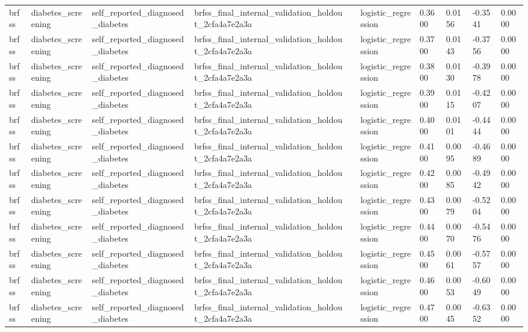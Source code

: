\begin{tabular}{llllllllll}
brfss & diabetes\_screening & self\_reported\_diagnosed\_diabetes & brfss\_final\_internal\_validation\_holdout\_2cfa4a7e2a3a &  & logistic\_regression & 0.3600 & 0.0156 & -0.3541 & 0.0000 \\
brfss & diabetes\_screening & self\_reported\_diagnosed\_diabetes & brfss\_final\_internal\_validation\_holdout\_2cfa4a7e2a3a &  & logistic\_regression & 0.3700 & 0.0143 & -0.3756 & 0.0000 \\
brfss & diabetes\_screening & self\_reported\_diagnosed\_diabetes & brfss\_final\_internal\_validation\_holdout\_2cfa4a7e2a3a &  & logistic\_regression & 0.3800 & 0.0130 & -0.3978 & 0.0000 \\
brfss & diabetes\_screening & self\_reported\_diagnosed\_diabetes & brfss\_final\_internal\_validation\_holdout\_2cfa4a7e2a3a &  & logistic\_regression & 0.3900 & 0.0115 & -0.4207 & 0.0000 \\
brfss & diabetes\_screening & self\_reported\_diagnosed\_diabetes & brfss\_final\_internal\_validation\_holdout\_2cfa4a7e2a3a &  & logistic\_regression & 0.4000 & 0.0101 & -0.4444 & 0.0000 \\
brfss & diabetes\_screening & self\_reported\_diagnosed\_diabetes & brfss\_final\_internal\_validation\_holdout\_2cfa4a7e2a3a &  & logistic\_regression & 0.4100 & 0.0095 & -0.4689 & 0.0000 \\
brfss & diabetes\_screening & self\_reported\_diagnosed\_diabetes & brfss\_final\_internal\_validation\_holdout\_2cfa4a7e2a3a &  & logistic\_regression & 0.4200 & 0.0085 & -0.4942 & 0.0000 \\
brfss & diabetes\_screening & self\_reported\_diagnosed\_diabetes & brfss\_final\_internal\_validation\_holdout\_2cfa4a7e2a3a &  & logistic\_regression & 0.4300 & 0.0079 & -0.5204 & 0.0000 \\
brfss & diabetes\_screening & self\_reported\_diagnosed\_diabetes & brfss\_final\_internal\_validation\_holdout\_2cfa4a7e2a3a &  & logistic\_regression & 0.4400 & 0.0070 & -0.5476 & 0.0000 \\
brfss & diabetes\_screening & self\_reported\_diagnosed\_diabetes & brfss\_final\_internal\_validation\_holdout\_2cfa4a7e2a3a &  & logistic\_regression & 0.4500 & 0.0061 & -0.5757 & 0.0000 \\
brfss & diabetes\_screening & self\_reported\_diagnosed\_diabetes & brfss\_final\_internal\_validation\_holdout\_2cfa4a7e2a3a &  & logistic\_regression & 0.4600 & 0.0053 & -0.6049 & 0.0000 \\
brfss & diabetes\_screening & self\_reported\_diagnosed\_diabetes & brfss\_final\_internal\_validation\_holdout\_2cfa4a7e2a3a &  & logistic\_regression & 0.4700 & 0.0045 & -0.6352 & 0.0000 \\

\end{tabular}
